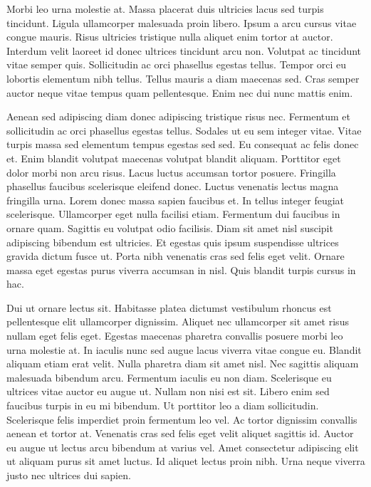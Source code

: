 \documentclass[]{article}
\begin{document}
Morbi leo urna molestie at. Massa placerat duis ultricies lacus sed turpis tincidunt. Ligula ullamcorper malesuada proin libero. Ipsum a arcu cursus vitae congue mauris. Risus ultricies tristique nulla aliquet enim tortor at auctor. Interdum velit laoreet id donec ultrices tincidunt arcu non. Volutpat ac tincidunt vitae semper quis. Sollicitudin ac orci phasellus egestas tellus. Tempor orci eu lobortis elementum nibh tellus. Tellus mauris a diam maecenas sed. Cras semper auctor neque vitae tempus quam pellentesque. Enim nec dui nunc mattis enim.

Aenean sed adipiscing diam donec adipiscing tristique risus nec. Fermentum et sollicitudin ac orci phasellus egestas tellus. Sodales ut eu sem integer vitae. Vitae turpis massa sed elementum tempus egestas sed sed. Eu consequat ac felis donec et. Enim blandit volutpat maecenas volutpat blandit aliquam. Porttitor eget dolor morbi non arcu risus. Lacus luctus accumsan tortor posuere. Fringilla phasellus faucibus scelerisque eleifend donec. Luctus venenatis lectus magna fringilla urna. Lorem donec massa sapien faucibus et. In tellus integer feugiat scelerisque. Ullamcorper eget nulla facilisi etiam. Fermentum dui faucibus in ornare quam. Sagittis eu volutpat odio facilisis. Diam sit amet nisl suscipit adipiscing bibendum est ultricies. Et egestas quis ipsum suspendisse ultrices gravida dictum fusce ut. Porta nibh venenatis cras sed felis eget velit. Ornare massa eget egestas purus viverra accumsan in nisl. Quis blandit turpis cursus in hac.

Dui ut ornare lectus sit. Habitasse platea dictumst vestibulum rhoncus est pellentesque elit ullamcorper dignissim. Aliquet nec ullamcorper sit amet risus nullam eget felis eget. Egestas maecenas pharetra convallis posuere morbi leo urna molestie at. In iaculis nunc sed augue lacus viverra vitae congue eu. Blandit aliquam etiam erat velit. Nulla pharetra diam sit amet nisl. Nec sagittis aliquam malesuada bibendum arcu. Fermentum iaculis eu non diam. Scelerisque eu ultrices vitae auctor eu augue ut. Nullam non nisi est sit. Libero enim sed faucibus turpis in eu mi bibendum. Ut porttitor leo a diam sollicitudin. Scelerisque felis imperdiet proin fermentum leo vel. Ac tortor dignissim convallis aenean et tortor at. Venenatis cras sed felis eget velit aliquet sagittis id. Auctor eu augue ut lectus arcu bibendum at varius vel. Amet consectetur adipiscing elit ut aliquam purus sit amet luctus. Id aliquet lectus proin nibh. Urna neque viverra justo nec ultrices dui sapien.
\end{document}
